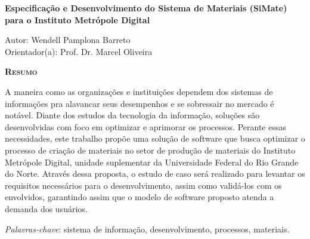 \begin{center}
	{\Large{\textbf{Especificação e Desenvolvimento do Sistema de Materiais (SiMate) para o Instituto Metrópole Digital}}}
\end{center}

\vspace{1cm}

\begin{flushright}
	Autor: Wendell Pamplona Barreto\\
	Orientador(a): Prof. Dr. Marcel Oliveira
\end{flushright}

\vspace{1cm}

\begin{center}
	\Large{\textsc{\textbf{Resumo}}}
\end{center}

\noindent A maneira como as organizações e instituições dependem dos sistemas de informações pra alavancar seus desempenhos e se sobressair no mercado é notável. Diante dos estudos da tecnologia da informação, soluções são desenvolvidas com foco em optimizar e aprimorar os processos. Perante essas necessidades, este trabalho propõe uma solução de software que busca optimizar o processo de criação de materiais no setor de produção de materiais do Instituto Metrópole Digital, unidade suplementar da Universidade Federal do Rio Grande do Norte. Através dessa proposta, o estudo de caso será realizado para levantar os requisitos necessários para o desenvolvimento, assim como validá-los com os envolvidos, garantindo assim que o modelo de software proposto atenda a demanda dos usuários. 

\noindent\textit{Palavras-chave}: sistema de informação, desenvolvimento, processos, materiais.